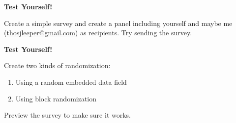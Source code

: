 \bgroup
{}
\begin{frame}[plain]{}
\begin{center}
\textbf{{\Large Test Yourself!}}

\vspace{2em}

Create a simple survey and create a panel including yourself and maybe me (\href{mailto:thosjleeper@gmail.com}{thosjleeper@gmail.com}) as recipients. Try sending the survey.

\end{center}
\end{frame}
\egroup




\bgroup
{}
\begin{frame}[plain]{}
\begin{center}
\textbf{{\Large Test Yourself!}}

\vspace{2em}

Create two kinds of randomization: 

\begin{enumerate}
\item Using a random embedded data field
\item Using block randomization
\end{enumerate}

Preview the survey to make sure it works.

\end{center}
\end{frame}
\egroup




